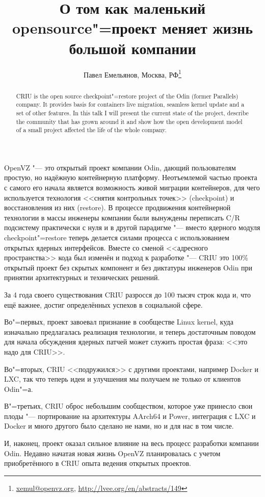 \documentclass[10pt, a5paper]{article}
\begin{document}
\title{О том как маленький opensource"=проект меняет жизнь большой компании}
\author{Павел Емельянов, Москва, РФ\footnote{\url{xemul@openvz.org}, \url{http://lvee.org/en/abstracts/149}}}
\maketitle
\begin{abstract}
CRIU is the open source checkpoint"=restore project of the Odin (former Parallels) company. It provides basis for containers live migration, seamless kernel update and a set of other features. In this talk I will present the current state of the project, describe the community that has grown around it and show how the open development model of a small project affected the life of the whole company.
\end{abstract}
OpenVZ "--- это открытый проект компании Odin, дающий пользователям простую, но надёжную контейнерную платформу. Неотъемлемой частью проекта с самого его начала является возможность живой миграции контейнеров, для чего используется технология <<снятия контрольных точек>> (checkpoint) и восстановления из них (restore). В процессе продвижения контейнерной технологии в массы инженеры компании были вынуждены переписать C/R подсистему практически с нуля и в другой парадигме "--- вместо ядерного модуля checkpoint"=restore теперь делается силами процесса с использованием открытых ядерных интерфейсов. Вместе со сменой <<адресного пространства>> кода был изменён и подход к разработке "--- CRIU это 100\% открытый проект без скрытых компонент и без диктатуры инженеров Odin при принятии архитектурных и технических решений.

За 4 года своего существования CRIU разросся до 100 тысяч строк кода и, что ещё важнее, достиг определённых успехов в социальной сфере.

Во"=первых, проект завоевал признание в сообществе Linux kernel, куда изначально предлагалась реализация технологии, и теперь достаточным поводом для начала обсуждения ядерных патчей может служить простая фраза: <<это надо для CRIU>>.

Во"=вторых, CRIU <<подружился>> с другими проектами, например Docker и LXC, так что теперь идеи и улучшения мы получаем не только от клиентов Odin"=а.

В"=третьих, CRIU оброс небольшим сообществом, которое уже принесло свои плоды "--- портирование на архитектуры AArch64 и Power, интеграция с LXC и Docker и много другого было сделано не нами, но и для нас в том числе.

И, наконец, проект оказал сильное влияние на весь процесс разработки компании Odin. Недавно начатая новая жизнь OpenVZ планировалась с учетом приобретённого в CRIU опыта ведения открытых проектов.
\end{document}
